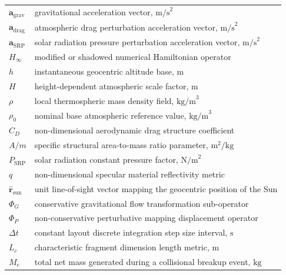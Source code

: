 \documentclass[11pt,letterpaper]{article}
\begin{document}
\begin{longtable}{@{}l @{\quad=\quad} l@{}}
$\mathbf{a}_{\text{grav}}$ & gravitational acceleration vector, $\text{m/s}^2$ \\
$\mathbf{a}_{\text{drag}}$ & atmospheric drag perturbation acceleration vector, $\text{m/s}^2$ \\
$\mathbf{a}_{\text{SRP}}$  & solar radiation pressure perturbation acceleration vector, $\text{m/s}^2$ \\
$H_{\infty}$               & modified or shadowed numerical Hamiltonian operator \\
$h$                        & instantaneous geocentric altitude base, $\text{m}$ \\
$H$                        & height-dependent atmospheric scale factor, $\text{m}$ \\
$\rho$                     & local thermospheric mass density field, $\text{kg/m}^3$ \\
$\rho_0$                   & nominal base atmospheric reference value, $\text{kg/m}^3$ \\
$C_D$                      & non-dimensional aerodynamic drag structure coefficient \\
$A/m$                      & specific structural area-to-mass ratio parameter, $\text{m}^2/\text{kg}$ \\
$P_{\text{SRP}}$           & solar radiation constant pressure factor, $\text{N/m}^2$ \\
$q$                        & non-dimensional specular material reflectivity metric \\
$\hat{\mathbf{r}}_{\text{sun}}$ & unit line-of-sight vector mapping the geocentric position of the Sun \\
$\Phi_G$                   & conservative gravitational flow transformation sub-operator \\
$\Phi_P$                   & non-conservative perturbative mapping displacement operator \\
$\Delta t$                 & constant layout discrete integration step size interval, $\text{s}$ \\
$L_c$                      & characteristic fragment dimension length metric, $\text{m}$ \\
$M_e$                      & total net mass generated during a collisional breakup event, $\text{kg}$
\end{longtable}
\end{document}

